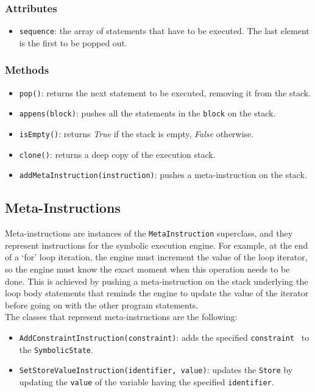 \documentclass[12pt,a4paper]{report}
\theoremstyle{definition}
\theoremstyle{definition}
\theoremstyle{definition}
\begin{document}
\subsubsection{Attributes}
\begin{itemize}
    \itemsep 0em
    \item \texttt{sequence}: the array of statements that have to be executed. The last element is the first to be popped out.
\end{itemize}
\subsubsection{Methods}
\begin{itemize}
    \itemsep 0em
    \item \texttt{pop()}: returns the next statement to be executed, removing it from the stack.
    \item \texttt{appens(block)}: pushes all the statements in the \texttt{block} on the stack.
    \item \texttt{isEmpty()}: returns \textit{True} if the stack is empty, \textit{False} otherwise.
    \item \texttt{clone()}: returns a deep copy of the execution stack.
    \item \texttt{addMetaInstruction(instruction)}: pushes a meta-instruction on the stack.
\end{itemize}


\subsection{Meta-Instructions}
Meta-instructions are instances of the \texttt{MetaInstruction} superclass, and they represent instructions for the symbolic execution engine. For example, at the end of a `for' loop iteration, the engine must increment the value of the loop iterator, so the engine must know the exact moment when this operation needs to be done. This is achieved by pushing a meta-instruction on the stack underlying the loop body statements that reminds the engine to update the value of the iterator before going on with the other program statements.\\
The classes that represent meta-instructions are the following:
\begin{itemize}
    \itemsep 0em
    \item \texttt{AddConstraintInstruction(constraint)}: adds the specified \texttt{constraint } to the \texttt{SymbolicState}.
    \item \texttt{SetStoreValueInstruction(identifier, value)}: updates the \texttt{Store} by updating the \texttt{value} of the variable having the specified \texttt{identifier}.
\end{itemize}
\end{document}
